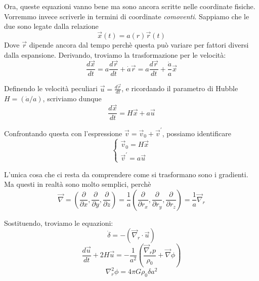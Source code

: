 \documentclass{report}
\begin{document}
Ora, queste equazioni vanno bene ma sono ancora scritte nelle coordinate fisiche. Vorremmo invece scriverle in termini di coordinate \emph{comoventi}. Sappiamo che le due sono legate dalla relazione 
\begin{equation}
    \vec{x}(t) = a(r)\vec{r}(t)
\end{equation}
Dove $\vec{r}$ dipende ancora dal tempo perchè questa può variare per fattori diversi dalla espansione. Derivando, troviamo la trasformazione per le velocità: 
\begin{equation}
    \frac{d\vec{x}}{dt} = a\frac{d\vec{r}}{dt} + \dot{a}\vec{r} = a\frac{d\vec{r}}{dt} + \frac{\dot{a}}{a}\vec{x} 
\end{equation}

Definendo le velocità peculiari $\vec{u} = \frac{d\vec{r}}{dt}$, e ricordando il parametro di Hubble $H = (\dot{a}/a)$, scriviamo dunque 
\begin{equation}
    \frac{d\vec{x}}{dt} = H\vec{x} + a\vec{u}
\end{equation}

Confrontando questa con l'espressione $\vec{v} = \vec{v}_0 + \vec{v}^{'}$, possiamo identificare 
\[\begin{cases}
    \vec{v}_0 = H\vec{x} \\
    \vec{v}^{'} = a\vec{u}
\end{cases}\]

L'unica cosa che ci resta da comprendere come si trasformano sono i gradienti. Ma questi in realtà sono molto semplici, perchè
\begin{equation}
    \vec{\nabla} = \left(\frac{\partial}{\partial x}, \frac{\partial}{\partial y}, \frac{\partial}{\partial z} \right) = \frac{1}{a}\left(\frac{\partial}{\partial r_x}, \frac{\partial}{\partial r_y}, \frac{\partial}{\partial r_z} \right) = \frac{1}{a}\vec{\nabla}_r
\end{equation}

Sostituendo, troviamo le equazioni: 
\begin{equation}
    \dot{\delta} = -(\vec{\nabla}_r \cdot \vec{u})
\end{equation}
\begin{equation}
    \frac{d\vec{u}}{dt} + 2H\vec{u} = -\frac{1}{a^2}\left (\frac{\vec{\nabla}_r p}{\rho_0} + \vec{\nabla}\phi\right)
\end{equation}
\begin{equation}
    \nabla^2_r\phi = 4\pi G \rho_0 \delta a^2
\end{equation}
\end{document}
